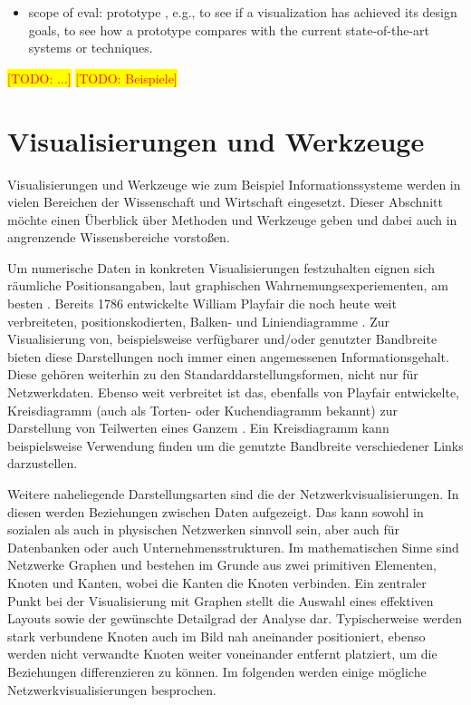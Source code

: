 \documentclass[draft=false
              ,paper=a4
              ,twoside=false
              ,fontsize=11pt
              ,headsepline
              ,BCOR10mm
              ,DIV11
              ]{scrbook}
\newcommand{\TODO}[1]{\colorbox{yellow}{\textcolor{red}{[TODO: #1]}}}
\begin{document}
\begin{itemize}
  \item scope of eval: prototype , e.g., to see if a visualization has achieved
its design goals, to see how a prototype compares with
the current state-of-the-art systems or techniques.
\end{itemize}
\TODO{...}
\TODO{Beispiele}

\section{Visualisierungen und Werkzeuge} %
\label{sec:visualisierungen_und_werkzeuge}

Visualisierungen und Werkzeuge wie zum Beispiel Informationssysteme werden in vielen Bereichen der Wissenschaft und Wirtschaft eingesetzt. Dieser Abschnitt möchte einen Überblick über Methoden und Werkzeuge geben und dabei auch in angrenzende Wissensbereiche vorstoßen. 

Um numerische Daten in konkreten Visualisierungen festzuhalten eignen sich räumliche Positionsangaben, laut graphischen Wahrnemungsexperiementen, am besten \cite{heer_tour_2010}. Bereits 1786 entwickelte William Playfair die noch heute weit verbreiteten, positionskodierten, Balken- und Liniendiagramme \cite{playfair_playfairs_1768}. Zur Visualisierung von, beispielsweise verfügbarer und/oder genutzter Bandbreite bieten diese Darstellungen noch immer einen angemessenen Informationsgehalt. Diese gehören weiterhin zu den Standarddarstellungsformen, nicht nur für Netzwerkdaten. Ebenso weit verbreitet ist das, ebenfalls von Playfair entwickelte, Kreisdiagramm (auch als Torten- oder Kuchendiagramm bekannt) zur Darstellung von Teilwerten eines Ganzem \cite{playfair_statistical_1801}. Ein Kreisdiagramm kann beispielsweise Verwendung finden um die genutzte Bandbreite verschiedener Links darzustellen. 

Weitere naheliegende Darstellungsarten sind die der Netzwerkvisualisierungen. In diesen werden Beziehungen zwischen Daten aufgezeigt. Das kann sowohl in sozialen als auch in physischen Netzwerken sinnvoll sein, aber auch für Datenbanken oder auch Unternehmensstrukturen. Im mathematischen Sinne sind Netzwerke Graphen und bestehen im Grunde aus zwei primitiven Elementen, Knoten und Kanten, wobei die Kanten die Knoten verbinden. Ein zentraler Punkt bei der Visualisierung mit Graphen stellt die Auswahl eines effektiven Layouts sowie der gewünschte Detailgrad der Analyse dar. Typischerweise werden stark verbundene Knoten auch im Bild nah aneinander positioniert, ebenso werden nicht verwandte Knoten weiter voneinander entfernt platziert, um die Beziehungen differenzieren zu können. Im folgenden werden einige mögliche Netzwerkvisualisierungen besprochen.
\end{document}
